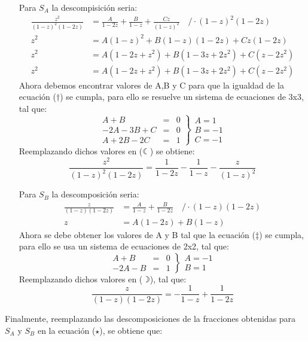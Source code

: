 \begin{enumerate}
    \item[Para $S_A$] la descompisición seria:
    \begin{align*}
        \frac{z^2}{(1-z)^2(1-2z)} &= \frac{A}{1-2z} + \frac{B}{1-z} + \frac{Cz}{(1-z)^2} \quad\text{/}\cdot (1-z)^2(1-2z) \tag{$\leftmoon$} \\
        z^2 &= A(1-z)^2 + B(1-z)(1-2z)+ Cz(1-2z) \\
        z^2 &= A(1-2z+z^2) + B(1-3z+2z^2) + C(z-2z^2) \\
        z^2 &= A(1-2z+z^2) + B(1-3z+2z^2) + C(z-2z^2) \tag{$\dagger$}
    \end{align*}
    Ahora debemos encontrar valores de A,B y C para que la igualdad de la ecuación ($\dagger$) se cumpla, para ello se resuelve un sistema de ecuaciones de 3x3, tal que:
    $$
    \left.
      \begin{array}{rcr}
       A + B &=& 0\\
      -2A -3B +C &=& 0 \\
      A + 2B - 2C &=& 1
      \end{array}
    \right\}
    \begin{array}{l}
       A= 1  \\
       B= -1 \\
       C= -1
    \end{array}
    $$
    Reemplazando dichos valores en ($\leftmoon$) se obtiene:
    $$\frac{z^2}{(1-z)^2(1-2z)} = \frac{1}{1-2z} - \frac{1}{1-z} - \frac{z}{(1-z)^2}$$
    \item[Para $S_B$] la descomposición seria:
    \begin{align*}
        \frac{z}{(1-z)(1-2z)} &= \frac{A}{1-z} + \frac{B}{1-2z} \quad \text{/}\cdot (1-z)(1-2z) \tag{$\rightmoon$}\\
        z &= A(1-2z) + B(1-z) \tag{$\ddagger$}
    \end{align*}
    Ahora se debe obtener los valores de A y B tal que la ecuación ($\ddagger$) se cumpla, para ello se usa un sistema de ecuaciones de 2x2, tal que:
    $$
    \left.
      \begin{array}{rcr}
       A + B &=& 0\\
      -2A -B &=& 1
      \end{array}
    \right\}
    \begin{array}{l}
       A= -1  \\
       B= 1
    \end{array}
    $$
    Reemplazando dichos valores en ($\rightmoon$), tal que:
    $$ \frac{z}{(1-z)(1-2z)} = -\frac{1}{1-z} + \frac{1}{1-2z} $$
\end{enumerate}
Finalmente, reemplazando las descomposiciones de la fracciones obtenidas para $S_A$ y $S_B$ en la ecuación ($\star$), se obtiene que:

